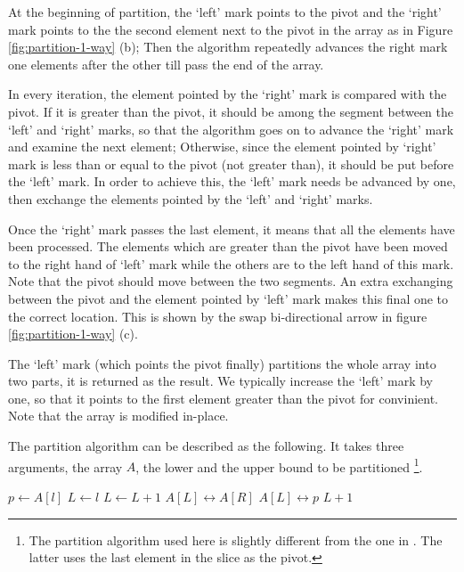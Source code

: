 \documentclass{article}
\begin{document}
At the beginning of partition, the `left' mark points to the pivot and the `right' mark points to the 
the second element next to the pivot in the array as in Figure
\ref{fig:partition-1-way} (b); Then the algorithm repeatedly advances the right mark one elements after the other
till pass the end of the array. 

In every iteration, the element pointed by the `right' mark is compared with the
pivot. If it is greater than the pivot, it should be among the segment between the `left' and `right' marks, so that
the algorithm goes on to advance the `right' mark and examine the next element; Otherwise, since the element pointed
by `right' mark is less than or equal to the pivot (not greater than), it should be put before the `left' mark.
In order to achieve this, the `left' mark needs be advanced by one, then exchange the elements pointed by the `left' 
and `right' marks.

Once the `right' mark passes the last element, it means that all the elements have been processed. The elements 
which are greater than the pivot have been moved to the right hand of `left' mark while the others are to the
left hand of this mark. Note that the pivot should move between the two segments. An extra exchanging between the pivot and
the element pointed by `left' mark makes this final one to the correct location. This is shown by the swap 
bi-directional arrow in figure \ref{fig:partition-1-way} (c).

The `left' mark (which points the pivot finally) partitions the whole array into two parts, it is 
returned as the result. We typically increase the `left' mark by one, so that it points to the
first element greater than the pivot for convinient. Note that the array is modified in-place.

The partition algorithm can be described as the following. It takes three arguments, the array $A$, the lower
and the upper bound to be partitioned \footnote{The partition algorithm used here is slightly different from
the one in \cite{CLRS}. The latter uses the last element in the slice as the pivot.}.

\begin{algorithmic}[1]
  \State $p \gets A[l]$  
  \State $L \gets l$ 
  \For{$R \in [l+1, u)$} 
     
      \State $L \gets L + 1$
      \State {} $A[L] \leftrightarrow A[R]$
    \EndIf
    \State {} $A[L] \leftrightarrow p$
  \EndFor
  \State \Return $L + 1$ 
\EndFunction
\end{algorithmic}
\end{document}
